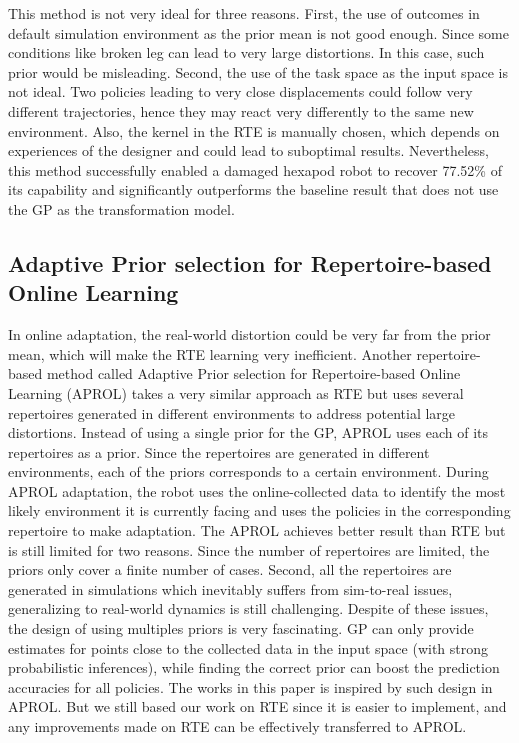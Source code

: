 This method is not very ideal for three reasons. 
First, the use of outcomes in default simulation environment as the prior mean is not good enough. Since some conditions like broken leg can lead to very large distortions. In this case, such prior would be misleading. 
Second, the use of the task space as the input space is not ideal. Two policies leading to very close displacements could follow very different trajectories, hence they may react very differently to the same new environment.
Also, the kernel in the RTE is manually chosen, which depends on experiences of the designer and could lead to suboptimal results.
Nevertheless, this method successfully enabled a damaged hexapod robot to recover 77.52\% of its capability \cite{RTE} and significantly outperforms the baseline result that does not use the GP as the transformation model.


\subsection{Adaptive Prior selection for Repertoire-based Online Learning}
In online adaptation, the real-world distortion could be very far from the prior mean, which will make the RTE learning very inefficient.
Another repertoire-based method called Adaptive Prior selection for Repertoire-based Online Learning \cite{APROL} (APROL) takes a very similar approach as RTE but uses several repertoires generated in different environments to address potential large distortions. 
Instead of using a single prior for the GP, APROL uses each of its repertoires as a prior.
Since the repertoires are generated in different environments, each of the priors corresponds to a certain environment. 
During APROL adaptation, the robot uses the online-collected data to identify the most likely environment it is currently facing and uses the policies in the corresponding repertoire to make adaptation.
The APROL achieves better result than RTE but is still limited for two reasons.
Since the number of repertoires are limited, the priors only cover a finite number of cases.
Second, all the repertoires are generated in simulations which inevitably suffers from sim-to-real issues, generalizing to real-world dynamics is still challenging.
Despite of these issues, the design of using multiples priors is very fascinating.
GP can only provide estimates for points close to the collected data in the input space (with strong probabilistic inferences), while finding the correct prior can boost the prediction accuracies for all policies.
The works in this paper is inspired by such design in APROL.
But we still based our work on RTE since it is easier to implement, and any improvements made on RTE can be effectively transferred to APROL.



